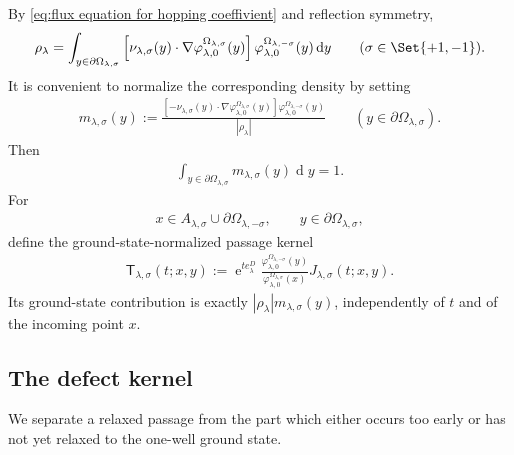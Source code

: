 \documentclass[a4paper,10pt]{article}
\numberwithin{equation}{section}
\theoremstyle{plain}
\theoremstyle{plain}
\theoremstyle{plain}
\theoremstyle{plain}
\theoremstyle{plain}
\theoremstyle{remark}
\theoremstyle{definition}
\newcommand{\ee}{\operatorname{e}}
\newcommand{\dif}{\operatorname{d}\!} %
\newcommand{\vf}{\varphi}
\newcommand{\abs}[1]{\left\lvert#1\right\rvert}
\newcommand{\eq}[1]{\begin{align*}#1\end{align*}}
\newcommand{\eql}[1]{\begin{align}#1\end{align}}
\begin{document}
By \cref{eq:flux equation for hopping coeffivient} and reflection symmetry,
\eql{
\rho_\lambda
=
\int_{y\in\partial\Omega_{\lambda,\sigma}}
\left[
\nu_{\lambda,\sigma}(y)\cdot
\nabla\vf_{\lambda,0}^{\Omega_{\lambda,\sigma}}(y)
\right]
\vf_{\lambda,0}^{\Omega_{\lambda,-\sigma}}(y)
\dif{y}
\qquad
(\sigma\in\Set{+1,-1}).
\label{eq:rho-both-directions}
}
It is convenient to normalize the corresponding density by setting
\eql{
m_{\lambda,\sigma}(y)
:=
\frac{
\left[
-\nu_{\lambda,\sigma}(y)\cdot
\nabla\vf_{\lambda,0}^{\Omega_{\lambda,\sigma}}(y)
\right]
\vf_{\lambda,0}^{\Omega_{\lambda,-\sigma}}(y)
}{
\abs{\rho_\lambda}
}
\qquad
(y\in\partial\Omega_{\lambda,\sigma}).
\label{eq:equilibrium-passage-density}
}
Then
\eq{
\int_{y\in\partial\Omega_{\lambda,\sigma}}
m_{\lambda,\sigma}(y)\dif{y}=1.
}
For
\eq{
x\in A_{\lambda,\sigma}\cup\partial\Omega_{\lambda,-\sigma},
\qquad
y\in\partial\Omega_{\lambda,\sigma},
}
define the ground-state-normalized passage kernel
\eql{
\mathsf T_{\lambda,\sigma}(t;x,y)
:=
\ee^{t e_\lambda^D}
\frac{
\vf_{\lambda,0}^{\Omega_{\lambda,-\sigma}}(y)
}{
\vf_{\lambda,0}^{\Omega_{\lambda,\sigma}}(x)
}
J_{\lambda,\sigma}(t;x,y).
\label{eq:normalized-passage-kernel}
}
Its ground-state contribution is exactly $\abs{\rho_\lambda} m_{\lambda,\sigma}(y)$, independently of $t$ and of the incoming point $x$.

\subsection{The defect kernel}

We separate a relaxed passage from the part which either occurs too early or has not yet relaxed to the one-well ground state.
\end{document}
